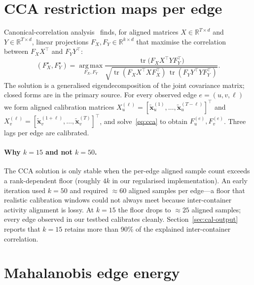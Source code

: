 \section{CCA restriction maps per edge}
\label{sec:cca}

Canonical-correlation analysis~\cite{hotelling1936} finds, for aligned
matrices $X \in \mathbb{R}^{T \times d}$ and $Y \in \mathbb{R}^{T \times d}$,
linear projections $F_X, F_Y \in \mathbb{R}^{k \times d}$ that maximise the
correlation between $F_X X^\top$ and $F_Y Y^\top$:
\begin{equation}
  (F_X^\star, F_Y^\star) = \operatorname*{arg\,max}_{F_X, F_Y}
  \frac{\operatorname{tr}\!\bigl(F_X X^\top Y F_Y^\top\bigr)}
       {\sqrt{\operatorname{tr}(F_X X^\top X F_X^\top)\,\operatorname{tr}(F_Y Y^\top Y F_Y^\top)}}.
  \label{eq:cca}
\end{equation}
The solution is a generalised eigendecomposition of the joint covariance
matrix; closed forms are in the primary source. For every observed edge
$e = (u, v, \ell)$ we form aligned calibration matrices
$X_u^{(\ell)} = [\tilde{\mathbf{x}}_u^{(1)}, \ldots,
\tilde{\mathbf{x}}_u^{(T-\ell)}]^\top$ and
$X_v^{(\ell)} = [\tilde{\mathbf{x}}_v^{(1+\ell)}, \ldots,
\tilde{\mathbf{x}}_v^{(T)}]^\top$, and solve~\eqref{eq:cca} to obtain
$F_u^{(e)}, F_v^{(e)}$. Three lags per edge are calibrated.

\paragraph{Why $k = 15$ and not $k = 50$.}  The CCA solution is only stable
when the per-edge aligned sample count exceeds a rank-dependent floor
(roughly $4k$ in our regularised implementation). An early iteration used
$k = 50$ and required $\approx 60$ aligned samples per edge---a floor that
realistic calibration windows could not always meet because inter-container
activity alignment is lossy. At $k = 15$ the floor drops to $\approx 25$
aligned samples; every edge observed in our testbed calibrates cleanly.
Section~\ref{sec:cal-output} reports that $k = 15$ retains more than 90\%
of the explained inter-container correlation.

\section{Mahalanobis edge energy}
\label{sec:mahal}

